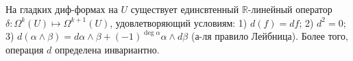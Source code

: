 \begin{to_lem} 
    На гладких диф-формах на $U$ существует единсвтенный $\mathbb{R}$-линейный оператор $\delta \colon \Omega^k (U) \mapsto \Omega^{k+1} (U)$, удовлетворяющий условиям: 
    1) $d(f) = df$;
    2) $d^2 = 0$;
    3) $d(\alpha \wedge \beta) = d \alpha \wedge \beta + (-1)^{\deg \alpha} \alpha \wedge d \beta$ (а-ля правило Лейбница).
    Более того, операция $d$ определена инвариантно.
\end{to_lem}

